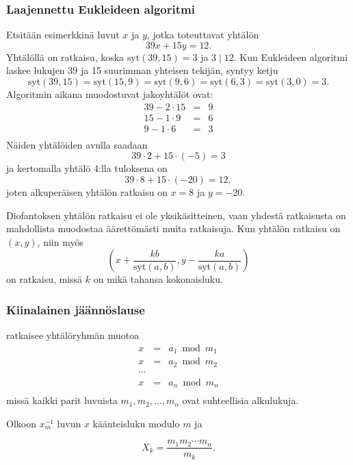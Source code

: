 
\subsubsection*{Laajennettu Eukleideen algoritmi}

Etsitään esimerkkinä luvut $x$ ja $y$,
jotka toteuttavat yhtälön
\[
39x + 15y = 12.
\]
Yhtälöllä on ratkaisu, koska $\textrm{syt}(39,15)=3$
ja $3 \mid 12$.
Kun Eukleideen algoritmi laskee lukujen
39 ja 15 suurimman
yhteisen tekijän, syntyy ketju
\[
\textrm{syt}(39,15) = \textrm{syt}(15,9)
= \textrm{syt}(9,6) = \textrm{syt}(6,3)
= \textrm{syt}(3,0) = 3. \]
Algoritmin aikana muodostuvat jakoyhtälöt ovat:
\[
\begin{array}{lcl}
39 - 2 \cdot 15 & = & 9 \\
15 - 1 \cdot 9 & = & 6 \\
9 - 1 \cdot 6 & = & 3 \\
\end{array}
\]
Näiden yhtälöiden avulla saadaan
\[
39 \cdot 2 + 15 \cdot (-5) = 3
\]
ja kertomalla yhtälö 4:lla tuloksena on
\[
39 \cdot 8 + 15 \cdot (-20) = 12,
\]
joten alkuperäisen yhtälön ratkaisu on $x=8$ ja $y=-20$.

Diofantoksen yhtälön ratkaisu ei ole yksikäsitteinen,
vaan yhdestä ratkaisusta on mahdollista muodostaa
äärettömästi muita ratkaisuja.
Kun yhtälön ratkaisu on $(x,y)$,
niin myös
\[(x+\frac{kb}{\textrm{syt}(a,b)},y-\frac{ka}{\textrm{syt}(a,b)})\]
on ratkaisu, missä $k$ on mikä tahansa kokonaisluku.

\subsubsection{Kiinalainen jäännöslause}


 ratkaisee yhtälöryhmän muotoa
\[
\begin{array}{lcl}
x & = & a_1 \bmod m_1 \\
x & = & a_2 \bmod m_2 \\
\cdots \\
x & = & a_n \bmod m_n \\
\end{array}
\]
missä kaikki parit luvuista $m_1,m_2,\ldots,m_n$
ovat suhteellisia alkulukuja.

Olkoon $x^{-1}_m$ luvun $x$ käänteisluku
modulo $m$ ja

\[ X_k = \frac{m_1 m_2 \cdots m_n}{m_k}.\]

